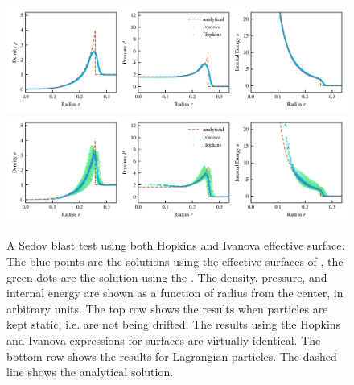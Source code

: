 \begin{figure}
    \centering
    \includegraphics[width=\textwidth]{figures/Meshless/sedov-static.png}%
\\
    \includegraphics[width=\textwidth]{figures/Meshless/sedov-lagrangian.png}%
    \caption{
A Sedov blast test using both Hopkins and Ivanova effective surface. The blue points are the
solutions using the effective surfaces of \cite{hopkinsGIZMONewClass2015}, the green dots are the
solution using the \cite{ivanovaCommonEnvelopeEvolution2013} \Aij. The density, pressure, and
internal energy are shown as a function of radius from the center, in arbitrary units. The top row
shows the results when particles are kept static, i.e. are not being drifted. The results using
the Hopkins and Ivanova expressions for surfaces \Aij are virtually identical. The bottom row shows
the results for Lagrangian particles. The dashed line shows the analytical solution.
    }
    \label{fig:hopkins-ivanova-sedov}
\end{figure}

